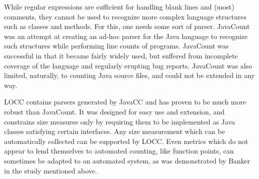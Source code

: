 While regular expressions are sufficient for handling blank lines and
(most) comments, they cannot be used to recognize more complex language
structures such as classes and methods.  For this, one needs some sort of
parser.  JavaCount\cite{javacount} was an attempt at creating an ad-hoc
parser for the Java language to recognize such structures while performing
line counts of programs.  JavaCount was successful in that it became fairly 
widely used, but suffered from incomplete coverage of the language and
regularly erupting bug reports.  JavaCount was also limited, naturally, to
counting Java source files, and could not be extended in any way.

LOCC contains parsers generated by JavaCC\cite{javacc-website} and has
proven to be much more robust than JavaCount.  It was designed for easy use 
and extension, and constrains size measures only by requiring them to be
implemented as Java classes satisfying certain interfaces.  Any size
measurement which can be automatically collected can be supported by LOCC.
Even metrics which do not appear to lend themselves to automated counting,
like function points, can sometimes be adapted to an automated system, as
was demonstrated by Banker in the study mentioned above.
